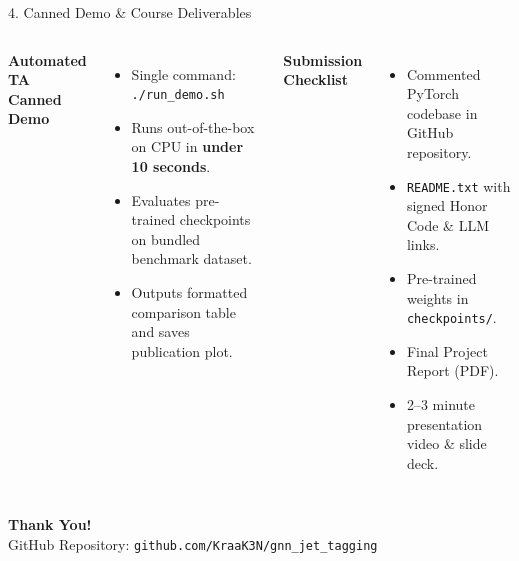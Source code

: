 \documentclass[aspectratio=169,11pt]{beamer}
\begin{document}
\begin{frame}{4. Canned Demo \& Course Deliverables}
  \begin{columns}[T]
      \textbf{Automated TA Canned Demo}
      \begin{itemize}\small
        \item Single command: \texttt{./run\_demo.sh}
        \item Runs out-of-the-box on CPU in \textbf{under 10 seconds}.
        \item Evaluates pre-trained checkpoints on bundled benchmark dataset.
        \item Outputs formatted comparison table and saves publication plot.
      \end{itemize}

      \textbf{Submission Checklist}
      \begin{itemize}\small
        \item Commented PyTorch codebase in GitHub repository.
        \item \texttt{README.txt} with signed Honor Code \& LLM links.
        \item Pre-trained weights in \texttt{checkpoints/}.
        \item Final Project Report (PDF).
        \item 2--3 minute presentation video \& slide deck.
      \end{itemize}
  \end{columns}
  \vspace{12pt}
  \centering \textbf{Thank You!}\\[4pt]
  {\scriptsize GitHub Repository: \texttt{github.com/KraaK3N/gnn\_jet\_tagging}}
\end{frame}
\end{document}
